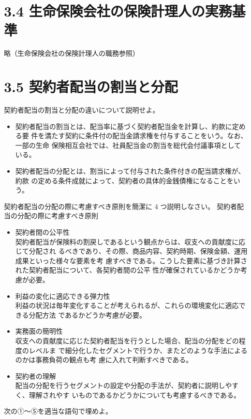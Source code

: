 \documentclass[report,gutter=10mm,fore-edge=10mm,uplatex,dvipdfmx]{jlreq}
\begin{document}
\section{3.4 生命保険会社の保険計理人の実務基準}
略（生命保険会社の保険計理人の職務参照）

\section{3.5 契約者配当の割当と分配}
契約者配当の割当と分配の違いについて説明せよ。

\begin{itemize}
 \item 契約者配当の割当とは、配当率に基づく契約者配当金を計算し、約款に定める要
件を満たす契約に条件付の配当金請求権を付与することをいう。なお、一部の生命
保険相互会社では、社員配当金の割当を総代会付議事項としている。
 \item 契約者配当の分配とは、割当によって付与された条件付きの配当請求権が、約款
の定める条件成就によって、契約者の具体的金銭債権になることをいう。
\end{itemize}

契約者配当の分配の際に考慮すべき原則を簡潔に 4 つ説明しなさい。
契約者配当の分配の際に考慮すべき原則
\begin{itemize}
 \item 
契約者間の公平性\\
契約者配当が保険料の割戻しであるという観点からは、収支への貢献度に応じて分配され
るべきであり、その際、商品内容、契約時期、保険金額、運用成果といった様々な要素を考
慮すべきである。こうした要素に基づき計算された契約者配当について、各契約者間の公平
性が確保されているかどうか考慮が必要。
 \item 
利益の変化に適応できる弾力性\\
利益の状況は毎年変化することが考えられるが、これらの環境変化に適応できる分配方法
であるかどうか考慮が必要。
 \item 
実務面の簡明性\\
収支への貢献度に応じた契約者配当を行うとした場合、配当の分配をどの程度のレベルま
で細分化したセグメントで行うか、またどのような手法によるのかは事務負荷の観点も考
慮に入れて判断すべきである。
 \item 
契約者の理解\\
配当の分配を行うセグメントの設定や分配の手法が、契約者に説明しやすく、理解されやす
いものであるかどうかについても考慮するべきである。
\end{itemize}
次の①～⑤を適当な語句で埋めよ。
\end{document}
